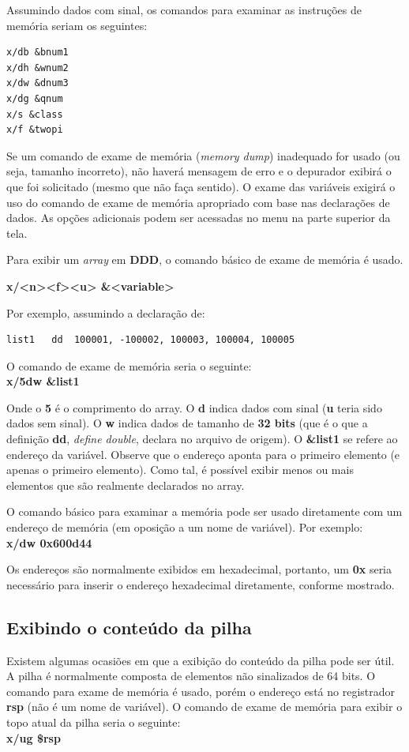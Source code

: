 

Assumindo dados com sinal, os comandos para examinar as instruções de memória seriam os seguintes:
\begin{verbatim}
x/db &bnum1
x/dh &wnum2
x/dw &dnum3
x/dg &qnum
x/s &class
x/f &twopi
\end{verbatim}

Se um comando de exame de memória (\textit{memory dump}) inadequado for usado (ou seja, tamanho incorreto), não haverá mensagem de erro e o depurador exibirá o que foi solicitado (mesmo que não faça sentido). O exame das variáveis exigirá o uso do comando de exame de memória  apropriado com base nas declarações de dados. As opções adicionais podem ser acessadas no menu na parte superior da tela.

Para exibir um \textit{array} em \textbf{DDD}, o comando básico de exame de memória é usado.
\begin{center}
	\textbf{x/<n><f><u> \&<variable>}
\end{center}

Por exemplo, assumindo a declaração de:
\begin{lstlisting}
list1	dd	100001, -100002, 100003, 100004, 100005
\end{lstlisting}

O comando de exame de memória seria o seguinte:\\
\textbf{x/5dw \&list1}

Onde o \textbf{5} é o comprimento do array. O \textbf{d} indica dados com sinal (\textbf{u} teria sido dados sem sinal). O \textbf{w} indica dados de tamanho de \textbf{32 bits} (que é o que a definição \textbf{dd}, \textit{define double}, declara no arquivo de origem). O \textbf{\&list1} se refere ao endereço da variável. Observe que o endereço aponta para o primeiro elemento (e apenas o primeiro elemento). Como tal, é possível exibir menos ou mais elementos que são realmente declarados no array.

O comando básico para examinar a memória pode ser usado diretamente com um endereço de memória (em oposição a um nome de variável). Por exemplo:\\
\textbf{x/dw 0x600d44}

Os endereços são normalmente exibidos em hexadecimal, portanto, um \textbf{0x} seria necessário para inserir o endereço hexadecimal diretamente, conforme mostrado.

\subsection{Exibindo o conteúdo da pilha}
Existem algumas ocasiões em que a exibição do conteúdo da pilha pode ser útil. A pilha é normalmente composta de elementos não sinalizados de 64 bits. O comando para exame de memória é usado, porém o endereço está no registrador \textbf{rsp} (não é um nome de variável). O comando de exame de memória para exibir o topo atual da pilha seria o seguinte:\\
\textbf{x/ug \$rsp}

